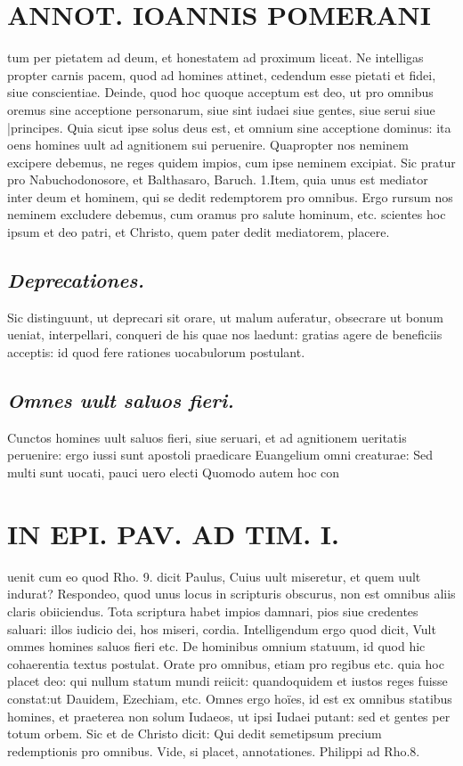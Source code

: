 \documentclass{article}
\begin{document}
\begin{pages}
\section*{ANNOT. IOANNIS POMERANI }\pstart tum per pietatem ad deum, et honestatem ad proximum liceat. Ne intelligas propter carnis pacem, quod ad homines attinet, cedendum esse pietati et fidei, siue conscientiae. Deinde, quod hoc quoque  acceptum est deo, ut pro omnibus oremus sine acceptione personarum, siue sint iudaei siue gentes, siue serui siue |principes. Quia sicut ipse solus deus est, et omnium sine acceptione dominus: ita oens homines uult ad agnitionem sui peruenire. Quapropter nos neminem excipere debemus, ne reges quidem impios, cum ipse neminem excipiat. Sic pratur pro Nabuchodonosore, et Balthasaro, Baruch. 1.Item, quia unus est mediator inter deum et hominem, qui se dedit redemptorem pro omnibus. Ergo rursum nos neminem excludere debemus, cum oramus pro salute hominum, etc. scientes hoc ipsum et deo patri, et Christo, quem pater dedit mediatorem, placere.  \pend
{}
{}
\subsection*{\textit{Deprecationes. }}\pstart Sic distinguunt, ut deprecari sit orare, ut malum auferatur, obsecrare ut bonum ueniat, interpellari, conqueri de his quae nos laedunt: gratias agere de beneficiis acceptis: id quod fere rationes uocabulorum postulant.  \pend
{}
{}
\subsection*{\textit{Omnes uult saluos fieri. }}\pstart Cunctos homines uult saluos fieri, siue seruari, et ad agnitionem ueritatis peruenire: ergo iussi sunt apostoli praedicare Euangelium omni creaturae: Sed multi sunt uocati, pauci uero electi Quomodo autem hoc con\pend
\section*{IN EPI. PAV. AD TIM. I. }
\marginpar{[ p.84 ]}\pstart uenit cum eo quod Rho. 9. dicit Paulus, Cuius uult miseretur, et quem uult indurat? Respondeo, quod unus locus in scripturis obscurus, non est omnibus aliis claris obiiciendus. Tota scriptura habet impios damnari, pios siue credentes saluari: illos iudicio dei, hos miseri, cordia. Intelligendum ergo quod dicit, Vult ommes homines saluos fieri etc. De hominibus omnium statuum, id quod hic cohaerentia textus postulat. Orate pro omnibus, etiam pro regibus etc. quia hoc placet deo: qui nullum statum mundi reiicit: quandoquidem et iustos reges fuisse constat:ut Dauidem, Ezechiam, etc. Omnes ergo hoïes, id est ex omnibus statibus homines, et praeterea non solum Iudaeos, ut ipsi Iudaei putant: sed et gentes per totum orbem. Sic et de Christo dicit: Qui dedit semetipsum precium redemptionis pro omnibus. Vide, si placet, annotationes. Philippi ad Rho.8.  \pend
{}
{}

\end{pages}
\end{document}
